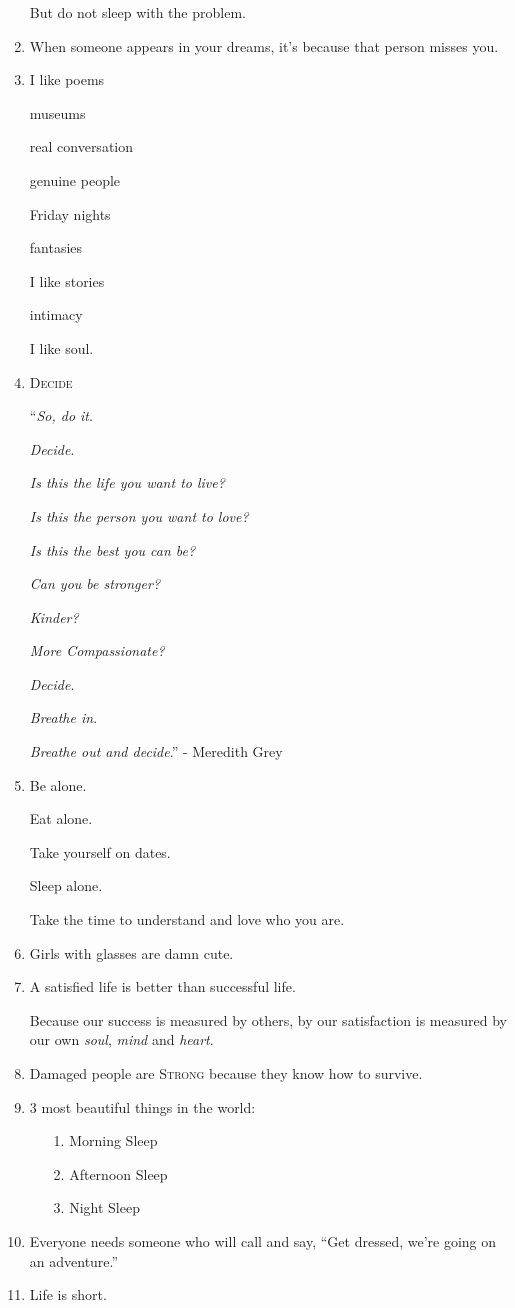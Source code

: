 \documentclass{article}
\begin{document}
\begin{enumerate}
	But do not sleep with the problem.
	\item When someone appears in your dreams, it's because that person misses you.
	\item I like poems
	
	museums
	
	real conversation
	
	genuine people
	
	Friday nights
	
	fantasies
	
	I like stories
	
	intimacy
	
	I like soul.
	\item \textsc{Decide}
	
	``\textit{So, do it}.
	
	\textit{Decide}.
	
	\textit{Is this the life you want to live?}
	
	\textit{Is this the person you want to love?}
	
	\textit{Is this the best you can be?}
	
	\textit{Can you be stronger?}
	
	\textit{Kinder?}
	
	\textit{More Compassionate?}
	
	\textit{Decide}.
	
	\textit{Breathe in}.
	
	\textit{Breathe out and decide}.'' - Meredith Grey
	\item Be alone.
	
	Eat alone.
	
	Take yourself on dates.
	
	Sleep alone.
	
	Take the time to understand and love who you are.
	\item Girls with glasses are damn cute.
	\item A satisfied life is better than successful life.
	
	Because our success is measured by others, by our satisfaction is measured by our own \textit{soul}, \textit{mind} and \textit{heart}.
	\item Damaged people are \textsc{Strong} because they know how to survive.
	\item 3 most beautiful things in the world:
	\begin{itemize}
		\item[1.] Morning Sleep
		\item[2.] Afternoon Sleep
		\item[3.] Night Sleep
	\end{itemize}
	\item Everyone needs someone who will call and say, ``Get dressed, we're going on an adventure.''
	\item Life is short.
	

\end{enumerate}
\end{document}
